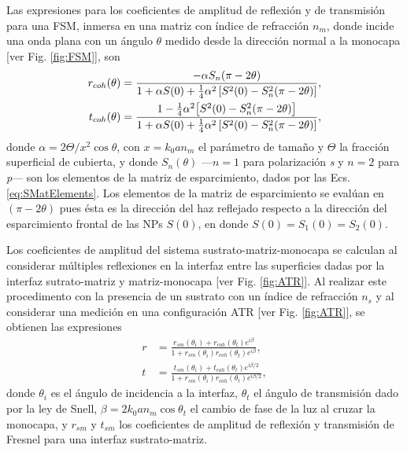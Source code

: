 \documentclass[letterpaper,11pt] {article}
\begin{document}
Las expresiones para los coeficientes de amplitud de reflexión y de transmisión para una FSM, inmersa en una matriz con índice de refracción $n_m$, donde incide una onda plana con un ángulo $\theta$ medido desde la dirección normal a la monocapa [ver Fig.  \ref{fig:FSM}], son \cite{reyes2018analytical}
	\begin{align}
	r_{coh}(\theta) &= \frac{-\alpha S_n(\pi-2\theta)}{1+\alpha S(0)+\frac14 \alpha^2 \left[S^2(0)-S_n^2 (\pi-2\theta) \right]},\label{eq:rFSM}\\
	t_{coh}(\theta) &= \frac{1-\frac14\alpha^2 \qty[S^2(0)-S^2_n(\pi-2\theta)]}{1+\alpha S(0)+\frac14 \alpha^2 \left[S^2(0)-S_n^2 (\pi-2\theta) \right]},\label{eq:tFSM}
	\end{align}
donde  $\alpha= 2\Theta/x^2\cos\theta$, con $x=k_0an_m$ el parámetro de tamaño y $\Theta$ la fracción superficial de cubierta, y donde $S_n(\theta)$ ---$n=1$ para polarización \emph{s} y $n=2$ para \emph{p}--- son los elementos de la matriz de esparcimiento, dados por las Ecs.  \eqref{eq:SMatElements}.  Los elementos de la matriz de esparcimiento se evalúan en $(\pi-2\theta)$ pues ésta es la dirección del haz reflejado respecto a la dirección del esparcimiento frontal de las NPs $S(0)$, en donde $S(0) = S_1(0)=S_2(0)$. 

%

Los coeficientes de amplitud del sistema sustrato-matriz-monocapa se calculan al considerar  múltiples reflexiones en la interfaz entre las superficies dadas por la interfaz sutrato-matriz y matriz-monocapa [ver Fig.  \ref{fig:ATR}]. Al realizar este procedimento con la presencia de un sustrato con un índice de refracción $n_s$ y al considerar una medición en una configuración ATR [ver Fig.  \ref{fig:ATR}], se obtienen las expresiones
	\begin{align}
	r &= \frac{r_{sm}(\theta_i)+r_{coh}(\theta_t)e^{i\beta}}
		{1+r_{sm}(\theta_i)r_{coh}(\theta_t)e^{i\beta}},
		\label{eq:r3CSM}\\
	t &= \frac{t_{sm}(\theta_i)+t_{coh}(\theta_t)e^{i\beta/2}}
		{1+r_{sm}(\theta_i)r_{coh}(\theta_t)e^{i\beta/2}},
		\label{eq:t3CSM}
	\end{align}
donde $\theta_i$ es el ángulo de incidencia a la interfaz, $\theta_t$ el ángulo de transmisión dado por la ley de Snell, $\beta=2 k_0 a n_m\cos\theta_t$ el cambio de fase de la luz al cruzar la monocapa, y $r_{sm}$ y $t_{sm}$ los coeficientes de amplitud de reflexión y transmisión de Fresnel para una interfaz sustrato-matriz. 
\end{document}
